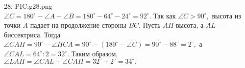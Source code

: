 28. {{PIC:g28.png}}\\
$\angle C=180^\circ-\angle A-\angle B=180^\circ-64^\circ-24^\circ=92^\circ.$ Так как $\angle C>90^\circ,$ высота из точки $A$ падает на продолжение стороны $BC.$   Пусть $AH$ высота, а $AL$ --- биссектриса. Тогда $\angle CAH=90^\circ-\angle HCA=90^\circ-(180^\circ-\angle C)=90^\circ-88^\circ=2^\circ,$ а $\angle CAL=64^\circ:2=32^\circ.$ Таким образом, $\angle LAH=\angle CAL+ \angle CAH=32^\circ+2^\circ=34^\circ.$\newpage\noindent
